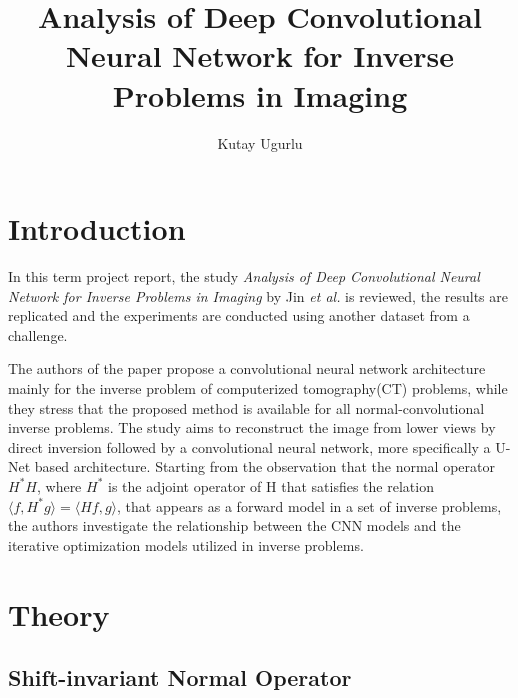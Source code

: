 \documentclass[journal, onecolumn, 11pt]{IEEEtran}
\author{Kutay Ugurlu}
\title{Analysis of Deep Convolutional Neural Network for Inverse Problems in Imaging
}
\begin{document}
\maketitle
\tableofcontents
\listoffigures
\listoftables
\clearpage

\section{Introduction}
In this term project report, the study \textit{Analysis of Deep Convolutional Neural Network for Inverse Problems in Imaging} by Jin \textit{et al.} \cite{FBPConvNet} is reviewed, the results are replicated and the experiments are conducted using another dataset from a challenge.

The authors of the paper propose a convolutional neural network architecture mainly for the inverse problem of computerized tomography(CT) problems, while they stress that the proposed method is available for all normal-convolutional inverse problems. The study aims to reconstruct the image from lower views by direct inversion followed by a convolutional neural network, more specifically a U-Net \cite{ronneberger2015u} based architecture. Starting from the observation that the normal operator $H^\ast H$, where $H^\ast$ is the adjoint operator of H that satisfies the relation $\langle f,H^\ast g \rangle = \langle Hf,g \rangle$, that appears as a forward model in a set of inverse problems, the authors investigate the relationship between the CNN models and the iterative optimization models utilized in inverse problems.  

\section{Theory}

\subsection{Shift-invariant Normal Operator}
\end{document}
